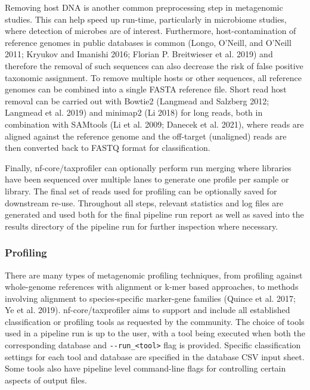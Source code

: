 \documentclass[
]{article}
\begin{document}
Removing host DNA is another common preprocessing step in metagenomic
studies. This can help speed up run-time, particularly in microbiome
studies, where detection of microbes are of interest. Furthermore,
host-contamination of reference genomes in public databases is common
(Longo, O'Neill, and O'Neill 2011; Kryukov and Imanishi 2016; Florian P.
Breitwieser et al. 2019) and therefore the removal of such sequences can
also decrease the risk of false positive taxonomic assignment. To remove
multiple hosts or other sequences, all reference genomes can be combined
into a single FASTA reference file. Short read host removal can be
carried out with Bowtie2 (Langmead and Salzberg 2012; Langmead et al.
2019) and minimap2 (Li 2018) for long reads, both in combination with
SAMtools (Li et al. 2009; Danecek et al. 2021), where reads are aligned
against the reference genome and the off-target (unaligned) reads are
then converted back to FASTQ format for classification.

Finally, nf-core/taxprofiler can optionally perform run merging where
libraries have been sequenced over multiple lanes to generate one
profile per sample or library. The final set of reads used for profiling
can be optionally saved for downstream re-use. Throughout all steps,
relevant statistics and log files are generated and used both for the
final pipeline run report as well as saved into the results directory of
the pipeline run for further inspection where necessary.

\hypertarget{profiling}{%
\subsubsection{Profiling}\label{profiling}}

There are many types of metagenomic profiling techniques, from profiling
against whole-genome references with alignment or k-mer based
approaches, to methods involving alignment to species-specific
marker-gene families (Quince et al. 2017; Ye et al. 2019).
nf-core/taxprofiler aims to support and include all established
classification or profiling tools as requested by the community. The
choice of tools used in a pipeline run is up to the user, with a tool
being executed when both the corresponding database and
\texttt{-\/-run\_\textless{}tool\textgreater{}} flag is provided.
Specific classification settings for each tool and database are
specified in the database CSV input sheet. Some tools also have pipeline
level command-line flags for controlling certain aspects of output
files.
\end{document}
